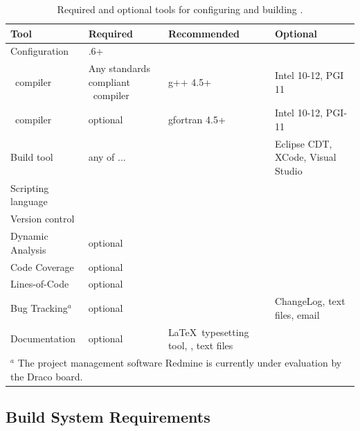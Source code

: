 \begin{table}
  \begin{center}
    \caption{Required and optional tools for configuring and building \draco.}
    \label{tab:reqtools}
    \begin{tabular}{lp{1.5in}p{1.5in}p{1.5in}}\hline\hline
    
          Tool & Required  & Recommended & Optional \\ \hline
	Configuration & \cmake-2.8.6+ & \ctest & \cdash  \\
	\cpp\ compiler & Any standards compliant \cpp\ compiler &  g++ 4.5+ & Intel 10-12, PGI 11 \\
	\fortran\ compiler & optional & gfortran 4.5+ & Intel 10-12, PGI-11 \\
	Build tool & any of ... & \gmake & Eclipse CDT, XCode, Visual Studio \\
	Scripting language & \cmake & \python & \perl \\
	Version control & \svn & & \git \\
	Dynamic Analysis & optional & \valgrind & \\
	Code Coverage & optional& \bullseye & \\
	Lines-of-Code & optional & \cloc & \\
	Bug Tracking$^a$ & optional & \teamforge & ChangeLog, text files, email \\
	Documentation & optional & \LaTeX\ typesetting tool, \doxygen, text files & \\	
	\hline \hline
	\multicolumn{4}{l}{$^a$ The project management software Redmine is currently under evaluation by the Draco board.} \\

    \end{tabular}
  \end{center}
\end{table}



\subsection{Build System Requirements}
\label{sec:build_sys_req}

